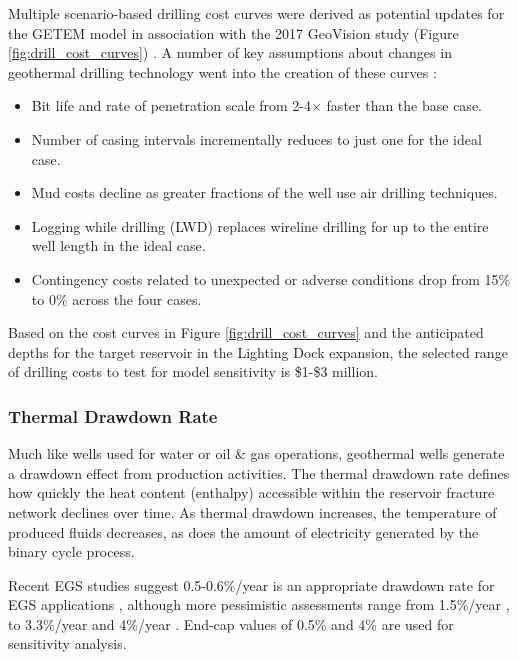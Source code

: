Multiple scenario-based drilling cost curves were derived as potential updates for the GETEM model in association with the 2017 GeoVision study (Figure \ref{fig:drill_cost_curves}) \citep{lowry_implications_2017}. A number of key assumptions about changes in geothermal drilling technology went into the creation of these curves \citep{augustine_geovision_2019}:

\begin{itemize}[itemsep=2pt]
    \item Bit life and rate of penetration scale from 2-4$\times$ faster than the base case.
    \item Number of casing intervals incrementally reduces to just one for the ideal case.
    \item Mud costs decline as greater fractions of the well use air drilling techniques.
    \item Logging while drilling (LWD) replaces wireline drilling for up to the entire well length in the ideal case.
    \item Contingency costs related to unexpected or adverse conditions drop from 15\% to 0\% across the four cases.
    
\end{itemize}
Based on the cost curves in Figure \ref{fig:drill_cost_curves} and the anticipated depths for the target reservoir in the Lighting Dock expansion, the selected range of drilling costs to test for model sensitivity is \$1-\$3 million.

\subsubsection{Thermal Drawdown Rate}
\label{ch4:uncert_drawdown}

Much like wells used for water or oil \& gas operations, geothermal wells generate a drawdown effect from production activities. The thermal drawdown rate defines how quickly the heat content (enthalpy) accessible within the reservoir fracture network declines over time. As thermal drawdown increases, the temperature of produced fluids decreases, as does the amount of electricity generated by the binary cycle process.

Recent EGS studies suggest 0.5-0.6\%/year is an appropriate drawdown rate for EGS applications \citep{augustine_geovision_2019}, although more pessimistic assessments range from 1.5\%/year \citep{beckers_low-temperature_2016}, to 3.3\%/year \citep{augustine_comparison_2006} and 4\%/year \citep{tester_economic_1990}. End-cap values of 0.5\% and 4\% are used for sensitivity analysis.

